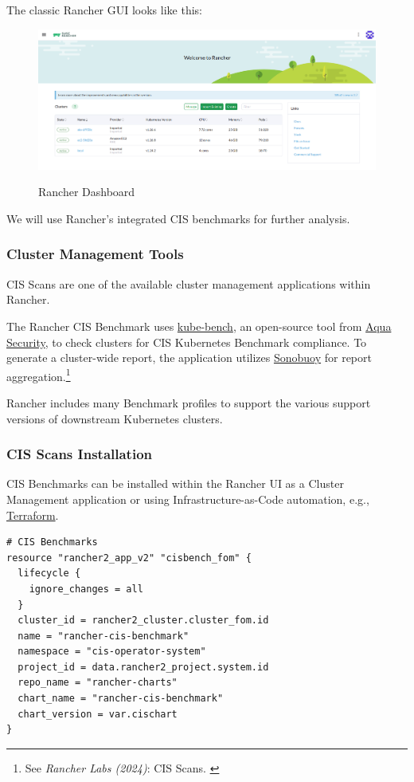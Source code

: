 The classic Rancher GUI looks like this:

\begin{figure}[H]
\centering
\caption {Rancher Dashboard}
\includegraphics[width=\linewidth]{images/rancher-dashboard.png}
\label{fig:rancherDashboard}
\end{figure}

We will use Rancher's integrated CIS benchmarks for further analysis.

\subsubsection{Cluster Management Tools}

CIS Scans are one of the available cluster management applications within Rancher.

The Rancher CIS Benchmark uses \href{https://github.com/aquasecurity/kube-bench}{kube-bench}, an open-source tool from \href{https://www.aquasec.com/}{Aqua Security}, to check clusters for CIS Kubernetes Benchmark compliance. To generate a cluster-wide report, the application utilizes \href{https://sonobuoy.io/}{Sonobuoy} for report aggregation.\footnote{See \textit{Rancher Labs (2024)}: CIS Scans. \cite{rancherBenchmarks}}

Rancher includes many Benchmark profiles to support the various support versions of downstream Kubernetes clusters.

\subsubsection{CIS Scans Installation}

CIS Benchmarks can be installed within the Rancher UI as a Cluster Management application or using Infrastructure-as-Code automation, e.g., \href{https://www.terraform.io/}{Terraform}.

\begin{lstlisting}[caption=Installing CIS Benchmarks, frame=single, basicstyle=\ttfamily]
# CIS Benchmarks
resource "rancher2_app_v2" "cisbench_fom" {
  lifecycle {
    ignore_changes = all
  }
  cluster_id = rancher2_cluster.cluster_fom.id
  name = "rancher-cis-benchmark"
  namespace = "cis-operator-system"
  project_id = data.rancher2_project.system.id
  repo_name = "rancher-charts"
  chart_name = "rancher-cis-benchmark"
  chart_version = var.cischart
}
\end{lstlisting}

